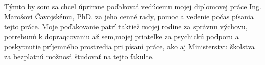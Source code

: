 Týmto by som sa chcel úprimne poďakovať vedúcemu mojej
diplomovej práce Ing. Marošovi Čavojskému, PhD. za jeho cenné rady, pomoc a vedenie počas písania tejto práce.
Moje poďakovanie patrí taktiež mojej rodine za správnu výchovu, potrebunú k dopraqcovaniu až sem,mojej priateľke za psychickú podporu a poskytnutie príjemného prostredia
pri písaní práce, ako aj Ministerstvu školstva za bezplatnú možnosť študovať na tejto fakulte.